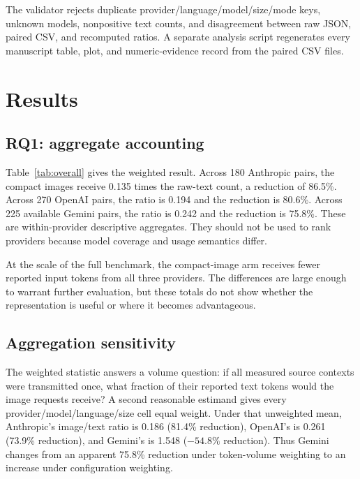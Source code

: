 \documentclass[sigconf,nonacm]{acmart}
\begin{document}
The validator rejects duplicate provider/language/model/size/mode keys, unknown
models, nonpositive text counts, and disagreement between raw JSON, paired CSV,
and recomputed ratios. A separate analysis script regenerates every manuscript
table, plot, and numeric-evidence record from the paired CSV files.

\section{Results}

\subsection{RQ1: aggregate accounting}

Table~\ref{tab:overall} gives the weighted result. Across 180 Anthropic pairs,
the compact images receive 0.135 times the raw-text count, a reduction of
86.5\%. Across 270 OpenAI pairs, the ratio is 0.194 and the reduction is 80.6\%.
Across 225 available Gemini pairs, the ratio is 0.242 and the reduction is
75.8\%. These are within-provider descriptive aggregates. They should not be
used to rank providers because model coverage and usage semantics differ.

\begin{table}[t]
  \centering
  \caption{Weighted provider-level accounting. ``Reduction'' is computed from
  summed provider-reported input tokens; it is not a monetary or compute
  saving.}
  \label{tab:overall}
  
\end{table}

At the scale of the full benchmark, the compact-image arm receives fewer
reported input tokens from all three providers. The differences are large
enough to warrant further evaluation, but these totals do not show whether the
representation is useful or where it becomes advantageous.

\subsection{Aggregation sensitivity}

The weighted statistic answers a volume question: if all measured source
contexts were transmitted once, what fraction of their reported text tokens
would the image requests receive? A second reasonable estimand gives every
provider/model/language/size cell equal weight. Under that unweighted mean,
Anthropic's image/text ratio is 0.186 (81.4\% reduction), OpenAI's is 0.261
(73.9\% reduction), and Gemini's is 1.548 ($-54.8\%$ reduction). Thus Gemini
changes from an apparent 75.8\% reduction under token-volume weighting to an
increase under configuration weighting.
\end{document}
